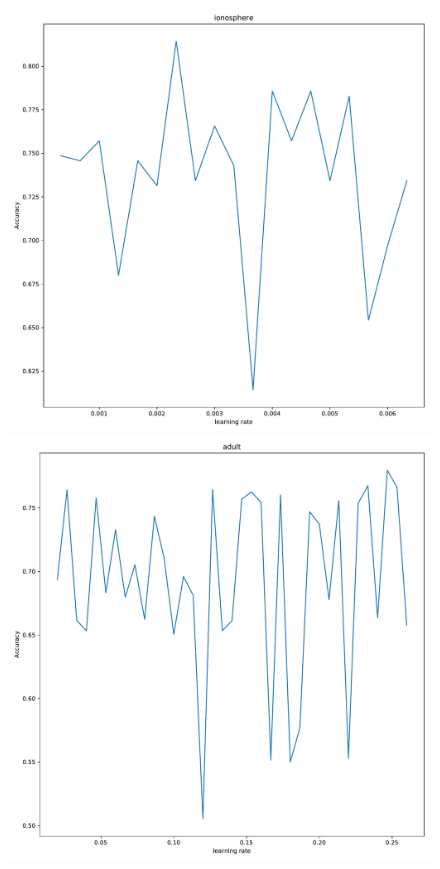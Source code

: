 \documentclass[11pt]{scrartcl}
\begin{document}
\begin{figure}[H]
	\centering
	\begin{minipage}{0.7\linewidth}
		\begin{minipage}[b]{0.48\linewidth}
		  \centering
		  \includegraphics[width=\linewidth]{fig/ionosphere_lr.pdf}
		\end{minipage}
		\hfill
		\begin{minipage}[b]{0.48\linewidth}
		  \centering			
		  \includegraphics[width= \linewidth]{fig/adult_lr.pdf}

\end{minipage}
\end{minipage}
\end{figure}
\end{document}
